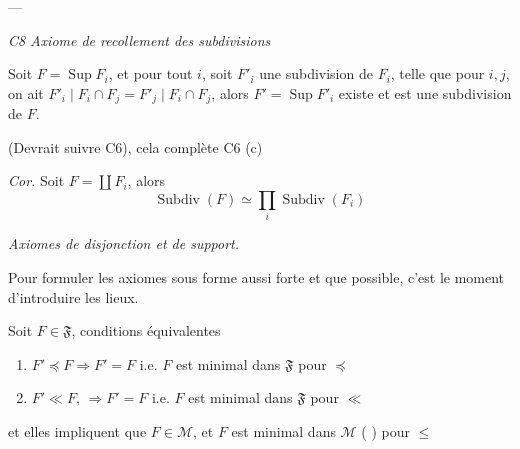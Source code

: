 \documentclass[11pt,a4paper]{article}
\begin{document}
 \quad ---

\emph{C8 \quad Axiome de recollement des subdivisions}

Soit $F = \operatorname{Sup} F_i$, et pour tout $i$, soit $F'_i$ une subdivision de $F_i$, telle que pour $i, j$, on ait $F'_i \mid F_i \cap F_j = F'_j \mid F_i \cap F_j$, alors $F' = \operatorname{Sup} F'_i$ existe et est une subdivision de $F$.

 (Devrait suivre C6), cela complète C6 (c)

\emph{Cor.} \quad Soit  $F = \coprod F_i$, alors
\[
  \operatorname{Subdiv}(F) \simeq \prod_i \operatorname{Subdiv}(F_i)
\]

\emph{Axiomes de disjonction et de support.}

Pour formuler les axiomes sous forme aussi forte et  que possible, c'est le moment d'introduire les lieux.

   Soit $F \in \mathfrak{F}$,   conditions équivalentes
\begin{enumerate}
  \item[a)] $F' \preccurlyeq F \Longrightarrow F' = F$ \quad i.e. $F$ est minimal dans $\mathfrak{F}$ pour $\preccurlyeq$
  \item[b)] $F' \ll F$,  $\Longrightarrow F' = F$ \quad i.e. $F$ est minimal dans $\mathfrak{F}$ \add{$\smallsetminus \lbrace\emptyset\rbrace$} pour $\ll$
\end{enumerate}
et elles impliquent que $F \in \mathcal{M}$, \struck{\ill{}} et $F$ est minimal dans $\mathcal{M}$ (\ill{} \ill{} \ill{}) pour $\leq$

 
 
 
\end{document}
